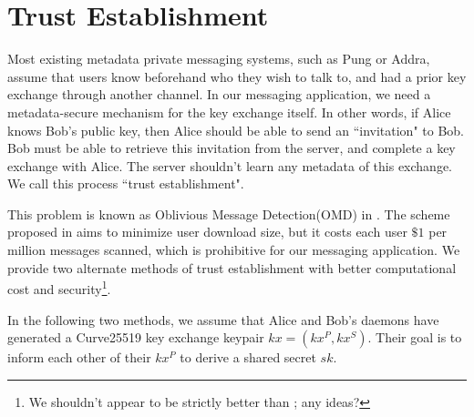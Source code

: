 \section{Trust Establishment}
\label{sec:trustestablishment}

Most existing metadata private messaging systems, such as Pung or Addra, assume that users know beforehand who they wish to talk to, and had a prior key exchange through another channel. 
In our messaging application, we need a metadata-secure mechanism for the key exchange itself. 
In other words, if Alice knows Bob's public key, then Alice should be able to send an ``invitation" to Bob.  Bob must be able to retrieve this invitation from the server, and complete a key exchange with Alice. The server shouldn't learn any metadata of this exchange. We call this process ``trust establishment".

This problem is known as Oblivious Message Detection(OMD) in \cite{liutromer2021}. The scheme proposed in \cite{liutromer2021} aims to minimize user download size, but it costs each user $\$ 1$ per million messages scanned, which is prohibitive for our messaging application. We provide two alternate methods of trust establishment with better computational cost and security\footnote{We shouldn't appear to be strictly better than \cite{liutromer2021}; any ideas?}.

In the following two methods, we assume that Alice and Bob's daemons have generated a Curve25519 key exchange keypair $kx = (kx^P, kx^S)$. Their goal is to inform each other of their $kx^P$ to derive a shared secret $sk$.



